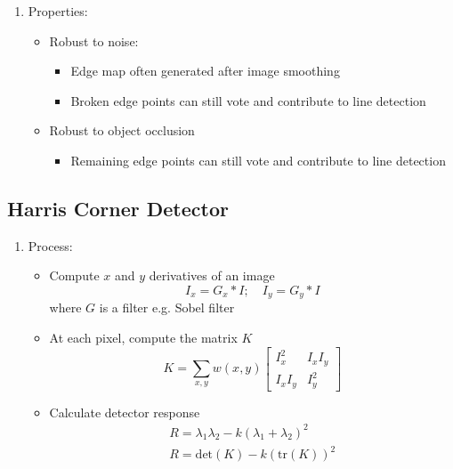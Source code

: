 \documentclass[9pt]{article}
\begin{document}
\begin{multicols*}{2}
\begin{enumerate}
            \item Properties:
            \begin{itemize}
                \item Robust to noise:
                \begin{itemize}
                    \item Edge map often generated after image smoothing 
                    \item Broken edge points can still vote and contribute to line detection 
                \end{itemize}

                \item Robust to object occlusion
                \begin{itemize}
                    \item Remaining edge points can still vote and contribute to line detection
                \end{itemize}
            \end{itemize}
        \end{enumerate}

        \subsection{Harris Corner Detector}
        \begin{enumerate}
            \item Process: 
            \begin{itemize}
                \item Compute $x$ and $y$ derivatives of an image
                $$
                    I_x = G_x \ast I; \quad I_y = G_y \ast I
                $$
                where $G$ is a filter e.g. Sobel filter 

                \item At each pixel, compute the matrix $K$
                $$
                    K = \sum_{x,y} w(x,y) \begin{bmatrix}
                        I_x^2 & I_x I_y \\ 
                        I_x I_y & I_y^2
                    \end{bmatrix}
                $$

                \item Calculate detector response
                \begin{gather*}
                    R = \lambda_1 \lambda_2 - k(\lambda_1 + \lambda_2)^2 \\
                    R = \text{det}(K) - k(\text{tr}(K))^2
                \end{gather*}


\end{itemize}
\end{enumerate}
\end{multicols*}
\end{document}
